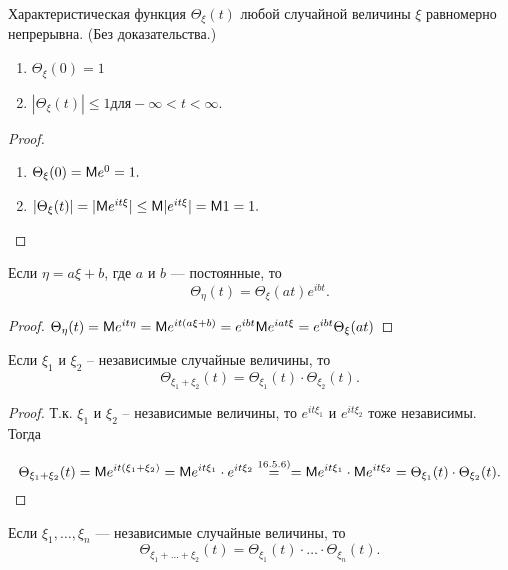\begin{theorem}
	Характеристическая функция $\Theta_{\xi} (t)$ любой случайной величины $\xi$ равномерно непрерывна. (Без доказательства.)
\end{theorem}

\begin{lemma}
\begin{enumerate}
	\item $\Theta_{\xi} (0) = 1$
	\item $|\Theta_{\xi} (t)| \leq 1 \text{для} −\infty < t < \infty$.
\end{enumerate}
\end{lemma}

\begin{proof}
\begin{enumerate}
	\item $\Theta_{\xi} (0) = \mathsf{M} e^0 = 1.$
	\item $|\Theta_{\xi} (t)| = |\mathsf{M} e^{it\xi} | \leq \mathsf{M}|e^{it\xi} | = \mathsf{M} 1 = 1.$
\end{enumerate}
\end{proof}

 \begin{lemma}
  	Если $\eta = a\xi + b$, где $a$ и $b$ — постоянные, то
$$\Theta_{\eta} (t) = \Theta_{\xi} (at) e^{ibt}.$$
  \end{lemma} 

  \begin{proof}
  	$\Theta_{\eta} (t) = \mathsf{M} e^{it\eta} = \mathsf{M} e^{it(a\xi+b)} = e^{ibt} \mathsf{M} e^{iat\xi} = e^{ibt} \Theta_{\xi} (at)$
  \end{proof}

\begin{lemma}
 Если $\xi_1$ и $\xi_2$ -- независимые случайные величины, то
$$\Theta_{\xi_1 +\xi_2} (t) = \Theta_{\xi_1} (t) \cdot \Theta_{\xi_2} (t).$$
 \end{lemma} 

\begin{proof}
	Т.к. $\xi_1$ и $\xi_2$ -- независимые величины, то $e^{it\xi_1}$ и $e^{it\xi_2}$ тоже независимы. Тогда

$$\Theta_{\xi_1 +\xi_2} (t) = \mathsf{M} e^{it(\xi_1 +\xi_2 )} = \mathsf{M} e^{it\xi_1} \cdot e^{it\xi_2} \stackrel{16.5.6)}{=}
= \mathsf{M} e^{it\xi_1} \cdot \mathsf{M} e^{it\xi_2} = \Theta_{\xi_1} (t) \cdot \Theta_{\xi_2} (t).$$
\end{proof}

\begin{consq}
Если $\xi_1 , \ldots , \xi_n$ — независимые случайные величины, то
$$\Theta_{\xi_1 + \ldots +\xi_2} (t) = \Theta_{\xi_1} (t) \cdot \ldots \cdot \Theta_{\xi_n} (t).$$
\end{consq}


